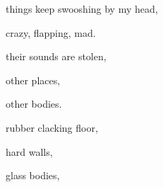 \documentclass[extrafontsizes, 48pt]{memoir}
\newcommand\blankpage{%
    \null
    \thispagestyle{empty}%
    \addtocounter{page}{-1}%
    \newpage}
\begin{document}
	\begin{minipage}{.6\textwidth}
	things keep swooshing by my head,
	\end{minipage}
	\newpage

	\begin{minipage}{.6\textwidth}
	crazy, flapping, mad.
	\end{minipage}
	\newpage

	\begin{minipage}{.6\textwidth}
	their sounds are stolen,
	\end{minipage}
	\newpage

	\begin{minipage}{.6\textwidth}
	other places,
	\end{minipage}
	\newpage

	\begin{minipage}{.6\textwidth}
	other bodies.
	\afterpage{\blankpage}
	\end{minipage}
	\newpage

	\begin{minipage}{.6\textwidth}
	rubber clacking floor,
	\end{minipage}
	\newpage

	\begin{minipage}{.6\textwidth}
	hard walls,
	\end{minipage}
	\newpage

	\begin{minipage}{.6\textwidth}
	glass bodies,
	\end{minipage}
	\newpage
\end{document}
